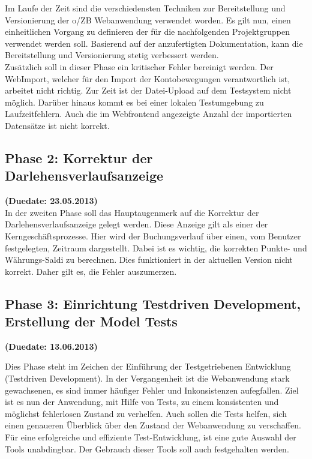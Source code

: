 \documentclass[12pt,             %
               a4paper,          %
               listof=totoc,     %
               index=totoc,      %
               bibliography=totoc,%
               oneside,         %
               BCOR1cm,          %
               english   %
               ]{scrbook}
\begin{document}
Im Laufe der Zeit sind die verschiedensten Techniken zur Bereitstellung und Versionierung der o/ZB Webanwendung verwendet worden. Es gilt nun, einen einheitlichen Vorgang zu definieren der für die nachfolgenden Projektgruppen verwendet werden soll. Basierend auf der anzufertigten Dokumentation, kann die Bereitstellung und Versionierung stetig verbessert werden.\\

Zusätzlich soll in dieser Phase ein kritischer Fehler bereinigt werden. Der WebImport, welcher für den Import der Kontobewegungen verantwortlich ist, arbeitet nicht richtig. Zur Zeit ist der Datei-Upload auf dem Testsystem nicht möglich. Darüber hinaus kommt es bei einer lokalen Testumgebung zu Laufzeitfehlern. Auch die im Webfrontend angezeigte Anzahl der importierten Datensätze ist nicht korrekt.

\subsection{Phase 2: Korrektur der Darlehensverlaufsanzeige}
\textbf {(Duedate: 23.05.2013)}\\
In der zweiten Phase soll das Hauptaugenmerk auf die Korrektur der Darlehensverlaufsanzeige gelegt werden. Diese Anzeige gilt als einer der Kerngeschäftsprozesse. Hier wird der Buchungsverlauf über einen, vom Benutzer festgelegten, Zeitraum dargestellt. Dabei ist es wichtig, die korrekten Punkte- und Währungs-Saldi zu berechnen. Dies funktioniert in der aktuellen Version nicht korrekt. Daher gilt es, die Fehler auszumerzen.  


\subsection{Phase 3: Einrichtung Testdriven Development, Erstellung der Model Tests}
\textbf {(Duedate: 13.06.2013)}

Dies Phase steht im Zeichen der Einführung der Testgetriebenen Entwicklung (\glqq Testdriven Development\grqq). In der Vergangenheit ist die Webanwendung stark gewachsenen, es sind immer häufiger Fehler und Inkonsistenzen aufegfallen. Ziel ist es nun der Anwendung, mit Hilfe von Tests, zu einem konsistenten und möglichst fehlerlosen Zustand zu verhelfen. Auch sollen die Tests helfen, sich einen genaueren Überblick über den Zustand der Webanwendung zu verschaffen. Für eine erfolgreiche und effiziente Test-Entwicklung, ist eine gute Auswahl der Tools unabdingbar. Der Gebrauch dieser Tools soll auch festgehalten werden.
\end{document}

